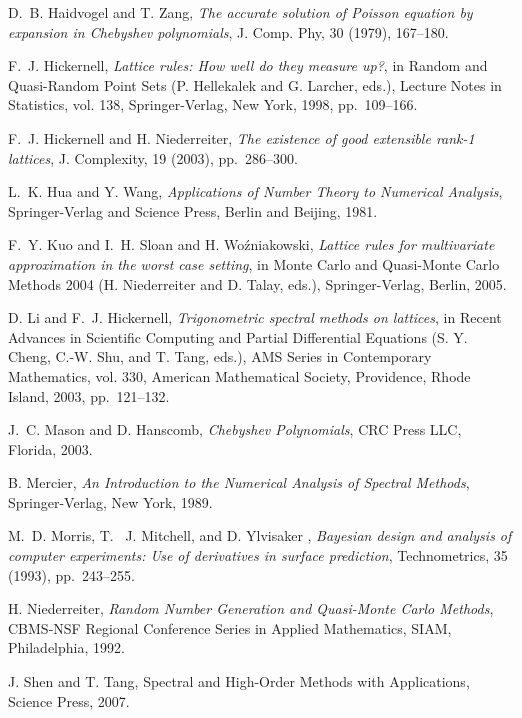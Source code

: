 \documentclass[article]{siamltex}
\begin{document}
\begin{thebibliography}{10}
 {\sc D.~B. Haidvogel and T. Zang},
{\em The accurate solution of Poisson equation by expansion in
Chebyshev polynomials}, J. Comp. Phy, 30 (1979), 167--180.


{\sc F.~J. Hickernell}, {\em Lattice rules: How well do they
measure up?}, in Random and Quasi-Random Point Sets (P. Hellekalek
and G. Larcher, eds.), Lecture Notes in Statistics, vol. 138,
Springer-Verlag, New York, 1998, pp.~109--166.

 {\sc F.~J. Hickernell and H.
Niederreiter}, {\em The existence of good extensible rank-1
lattices}, J. Complexity, 19 (2003), pp.~286--300.

 {\sc L.~K. Hua and Y. Wang}, {\em
Applications of Number Theory to Numerical Analysis},
Springer-Verlag and Science Press, Berlin and Beijing, 1981.

 {\sc F.~Y. Kuo and I.~H. Sloan and H.
Wo\'zniakowski}, {\em Lattice rules for multivariate approximation
in the worst case setting},  in {M}onte {C}arlo and Quasi-{M}onte
{C}arlo Methods 2004 (H. Niederreiter and D. Talay, eds.),
Springer-Verlag, Berlin, 2005.

{\sc D. Li and F.~J. Hickernell}, {\em Trigonometric spectral
methods on lattices}, in Recent Advances in Scientific Computing
and Partial Differential Equations (S. Y. Cheng, C.-W. Shu, and T.
Tang, eds.), AMS Series in Contemporary Mathematics, vol. 330,
American Mathematical Society, Providence, Rhode Island, 2003,
pp.~121--132.

 {\sc J.~C. Mason and D. Hanscomb}, {\em
Chebyshev Polynomials}, CRC Press LLC, Florida, 2003.

 {\sc B. Mercier}, {\em An Introduction to
the Numerical Analysis of Spectral Methods}, Springer-Verlag, New
York, 1989.

 {\sc  M.~D. Morris,  T. ~J. Mitchell,
and D. Ylvisaker }, {\em Bayesian design and analysis of computer
experiments: Use of derivatives in surface prediction},
Technometrics, 35 (1993), pp.~243--255.

 {\sc H. Niederreiter}, {\em Random
Number Generation and Quasi-Monte Carlo Methods}, CBMS-NSF
Regional Conference Series in Applied Mathematics, SIAM,
Philadelphia, 1992.

 {\sc J. Shen and T. Tang},
Spectral and High-Order Methods with Applications, Science Press,
2007.


\end{thebibliography}
\end{document}
